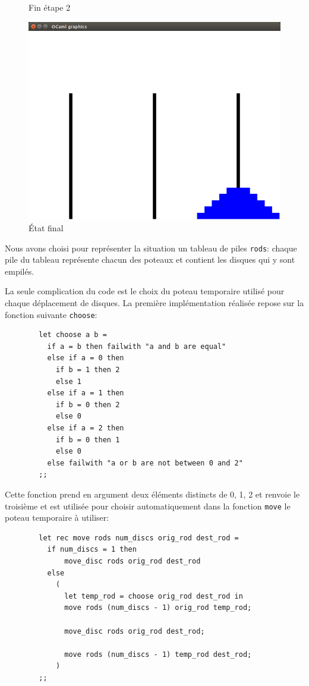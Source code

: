 \documentclass[a4paper, 11pt]{article}%
\begin{document}
\begin{figure}[!h]
			  \caption{Fin étape 2}\label{fig:hanoi_mid2}
			\endminipage\hfill
			  \includegraphics[width=\linewidth]{hanoi_end.png}
			  \caption{État final}\label{fig:hanoi_end}
			\endminipage\hfill
		\end{figure}

		Nous avons choisi pour représenter la situation un tableau de piles
		\texttt{rods}: chaque pile du tableau représente chacun des poteaux et
		contient les disques qui y sont empilés.

		La seule complication du code est le choix du poteau temporaire utilisé
		pour chaque déplacement de disques. La première implémentation réalisée
		repose sur la fonction suivante \texttt{choose}:

		\begin{lstlisting}
		let choose a b =
		  if a = b then failwith "a and b are equal"
		  else if a = 0 then
			if b = 1 then 2
			else 1
		  else if a = 1 then
			if b = 0 then 2
			else 0
		  else if a = 2 then
			if b = 0 then 1
			else 0
		  else failwith "a or b are not between 0 and 2"
		;;
		\end{lstlisting}

		Cette fonction prend en argument deux éléments distincts de {0, 1, 2} et
		renvoie le troisième et est utilisée pour choisir automatiquement dans
		la fonction \texttt{move} le poteau temporaire à utiliser:

		\begin{lstlisting}
		let rec move rods num_discs orig_rod dest_rod =
		  if num_discs = 1 then
			  move_disc rods orig_rod dest_rod
		  else
			(
			  let temp_rod = choose orig_rod dest_rod in
			  move rods (num_discs - 1) orig_rod temp_rod;
			  
			  move_disc rods orig_rod dest_rod;
			  
			  move rods (num_discs - 1) temp_rod dest_rod;
			)
		;;
		\end{lstlisting}
\end{document}
